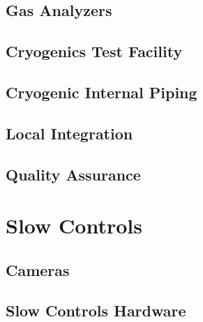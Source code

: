 \subsection{Gas Analyzers}
\label{sec:fdsp-slow-cryo-gas-anlyz}

\subsection{Cryogenics Test Facility}
\label{sec:fdsp-slow-cryo-test-facil}

\subsection{Cryogenic Internal Piping}
\label{sec:fdsp-slow-cryo-int-piping}

\subsection{Local Integration}
\label{sec:fdsp-slow-cryo-loc-integ}


\subsection{Quality Assurance}
\label{sec:fdsp-slow-cryo-qa}



\section{Slow Controls}
\label{sec:fdsp-slow-cryo-ctrl}




\subsection{Cameras}
\label{sec:fdsp-slow-cryo-cameras}

\subsection{Slow Controls Hardware}
\label{sec:fdsp-slow-cryo-hdwr}

